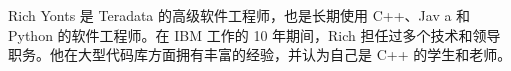 

Rich Yonts 是 Teradata 的高级软件工程师，也是长期使用 C++、Jav a 和 Python 的软件工程师。在 IBM 工作的 10 年期间，Rich 担任过多个技术和领导职务。他在大型代码库方面拥有丰富的经验，并认为自己是 C++ 的学生和老师。
